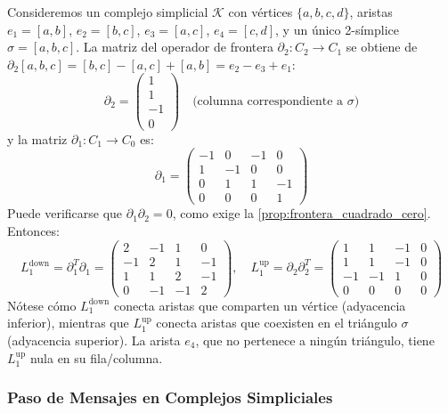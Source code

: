 \begin{example}\label{ex:hodge_laplacian_triangular}
	Consideremos un complejo simplicial $\mathcal{K}$ con vértices $\{a, b, c, d\}$, aristas $e_1 = [a,b]$, $e_2 = [b,c]$, $e_3 = [a,c]$, $e_4 = [c,d]$, y un único 2-símplice $\sigma = [a,b,c]$. La matriz del operador de frontera $\partial_2: C_2 \to C_1$ se obtiene de $\partial_2[a,b,c] = [b,c] - [a,c] + [a,b] = e_2 - e_3 + e_1$:
	\[
		\partial_2 = \begin{pmatrix} 1 \\ 1 \\ -1 \\ 0 \end{pmatrix} \quad \text{(columna correspondiente a $\sigma$)}
	\]
	y la matriz $\partial_1: C_1 \to C_0$ es:
	\[
		\partial_1 = \begin{pmatrix} -1 & 0 & -1 & 0 \\ 1 & -1 & 0 & 0 \\ 0 & 1 & 1 & -1 \\ 0 & 0 & 0 & 1 \end{pmatrix}
	\]
	Puede verificarse que $\partial_1 \partial_2 = 0$, como exige la \autoref{prop:frontera_cuadrado_cero}. Entonces:
	\[
		L_1^{\mathrm{down}} = \partial_1^T \partial_1 = \begin{pmatrix} 2 & -1 & 1 & 0 \\ -1 & 2 & 1 & -1 \\ 1 & 1 & 2 & -1 \\ 0 & -1 & -1 & 2 \end{pmatrix}, \quad
		L_1^{\mathrm{up}} = \partial_2 \partial_2^T = \begin{pmatrix} 1 & 1 & -1 & 0 \\ 1 & 1 & -1 & 0 \\ -1 & -1 & 1 & 0 \\ 0 & 0 & 0 & 0 \end{pmatrix}
	\]
	Nótese cómo $L_1^{\mathrm{down}}$ conecta aristas que comparten un vértice (adyacencia inferior), mientras que $L_1^{\mathrm{up}}$ conecta aristas que coexisten en el triángulo $\sigma$ (adyacencia superior). La arista $e_4$, que no pertenece a ningún triángulo, tiene $L_1^{\mathrm{up}}$ nula en su fila/columna.
\end{example}

\subsubsection{Paso de Mensajes en Complejos Simpliciales}\label{subsubsec:message_passing_simplicial_gdl}

